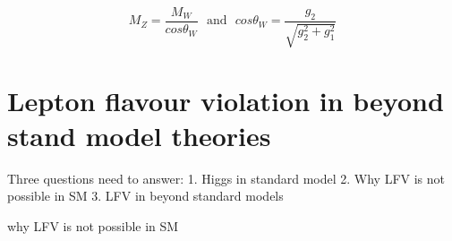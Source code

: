 \begin{equation}
M_{Z}=\frac{M_{W}}{cos\theta_{W}}~~~ \textrm{and}~~~
cos\theta_{W}=\frac{g_{2}}{\sqrt{g_{2}^{2}+g_{1}^{2}}}
\end{equation}









\section{Lepton flavour violation in beyond stand model theories}


Three questions need to answer:
1. Higgs in standard model
2. Why LFV is not possible in SM
3. LFV in beyond standard models

why LFV is not possible in SM